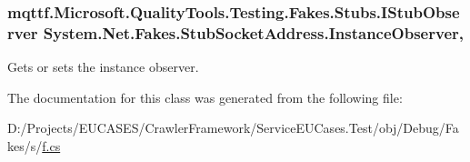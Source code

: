 \hypertarget{class_system_1_1_net_1_1_fakes_1_1_stub_socket_address_a9d80e0414df2a614981ad4d727fbe93e}{
\subsubsection[{Instance\-Observer}]{\setlength{\rightskip}{0pt plus 5cm}mqttf.\-Microsoft.\-Quality\-Tools.\-Testing.\-Fakes.\-Stubs.\-I\-Stub\-Observer System.\-Net.\-Fakes.\-Stub\-Socket\-Address.\-Instance\-Observer\hspace{0.3cm}{\ttfamily [get]}, {\ttfamily [set]}}}\label{class_system_1_1_net_1_1_fakes_1_1_stub_socket_address_a9d80e0414df2a614981ad4d727fbe93e}


Gets or sets the instance observer.



The documentation for this class was generated from the following file\-:\begin{DoxyCompactItemize}
\item 
D\-:/\-Projects/\-E\-U\-C\-A\-S\-E\-S/\-Crawler\-Framework/\-Service\-E\-U\-Cases.\-Test/obj/\-Debug/\-Fakes/s/\hyperlink{s_2f_8cs}{f.\-cs}\end{DoxyCompactItemize}
